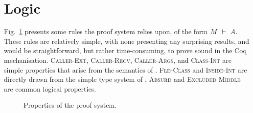 \section{\SpecO Logic}
\label{app:assert_logic}

Fig.~\ref{f:assertProperties} presents some rules the
\SpecO proof system relies upon, of the form $M\ \vdash\ A$. These rules
are relatively simple, with none presenting any surprising results,
and would be straightforward, but rather time-consuming, to
prove sound in the Coq mechanisation.  
\textsc{Caller-Ext}, \textsc{Caller-Recv}, \textsc{Caller-Args},
and \textsc{Class-Int} are simple properties that arise from 
the semantics of \SpecO.
\textsc{Fld-Class} and \textsc{Inside-Int} are directly drawn from 
the simple type system of \Loo.
\textsc{Absurd} and \textsc{Excluded Middle} are common logical properties.

{
\begin{figure}[hb]
\footnotesize
{}
\normalsize
\caption{Properties of the \SpecO proof system.}
\label{f:assertProperties}
\end{figure}}

